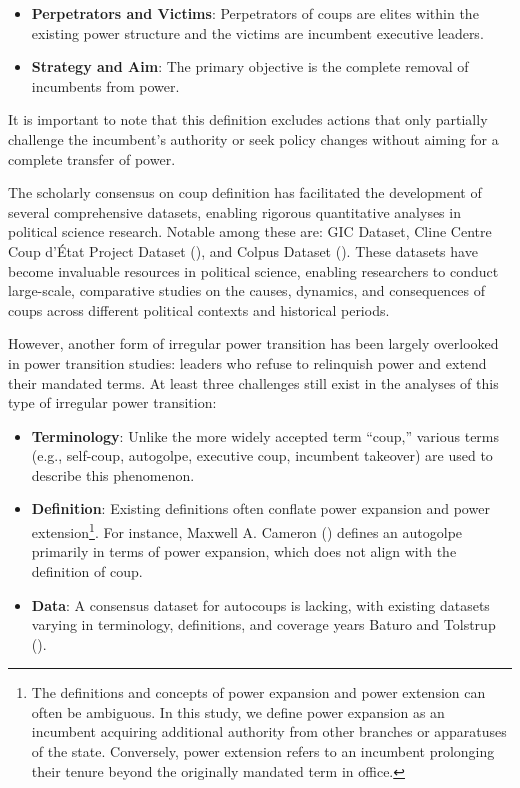 \documentclass[
  12pt,
]{report}
\begin{document}
\begin{itemize}
\item
  \textbf{Perpetrators and Victims}: Perpetrators of coups are elites
  within the existing power structure and the victims are incumbent
  executive leaders.
\item
  \textbf{Strategy and Aim}: The primary objective is the complete
  removal of incumbents from power.
\end{itemize}

It is important to note that this definition excludes actions that only
partially challenge the incumbent's authority or seek policy changes
without aiming for a complete transfer of power.

The scholarly consensus on coup definition has facilitated the
development of several comprehensive datasets, enabling rigorous
quantitative analyses in political science research. Notable among these
are: GIC Dataset, Cline Centre Coup d'État Project Dataset
(), and Colpus Dataset
(). These datasets
have become invaluable resources in political science, enabling
researchers to conduct large-scale, comparative studies on the causes,
dynamics, and consequences of coups across different political contexts
and historical periods.

However, another form of irregular power transition has been largely
overlooked in power transition studies: leaders who refuse to relinquish
power and extend their mandated terms. At least three challenges still
exist in the analyses of this type of irregular power transition:

\begin{itemize}
\item
  \textbf{Terminology}: Unlike the more widely accepted term ``coup,''
  various terms (e.g., self-coup, autogolpe, executive coup, incumbent
  takeover) are used to describe this phenomenon.
\item
  \textbf{Definition}: Existing definitions often conflate power
  expansion and power extension\footnote{The definitions and concepts of
    power expansion and power extension can often be ambiguous. In this
    study, we define power expansion as an incumbent acquiring
    additional authority from other branches or apparatuses of the
    state. Conversely, power extension refers to an incumbent prolonging
    their tenure beyond the originally mandated term in office.}. For
  instance, Maxwell A. Cameron ()
  defines an autogolpe primarily in terms of power expansion, which does
  not align with the definition of coup.
\item
  \textbf{Data}: A consensus dataset for autocoups is lacking, with
  existing datasets varying in terminology, definitions, and coverage
  years Baturo and Tolstrup ().
\end{itemize}
\end{document}
